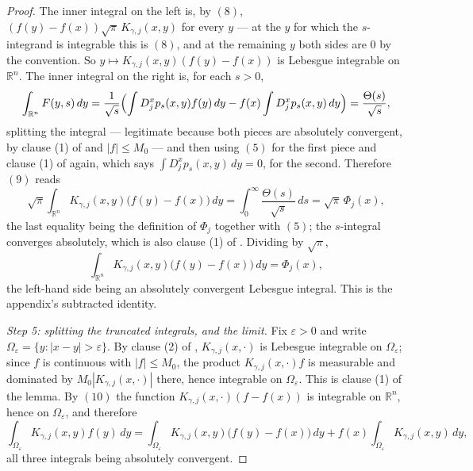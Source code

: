 \begin{proof}
The inner integral on the left is, by $(8)$,
$(f(y)-f(x))\sqrt\pi\,K_{\gamma,j}(x,y)$ for every $y$ --- at the $y$ for which
the $s$-integrand is integrable this is $(8)$, and at the remaining $y$ both
sides are $0$ by the convention.  So
$y \mapsto K_{\gamma,j}(x,y)(f(y)-f(x))$ is Lebesgue integrable on
$\mathbb{R}^n$.  The inner integral on the right is, for each $s > 0$,
\[
  \int_{\mathbb{R}^n}F(y,s)\,dy
    = \frac{1}{\sqrt s}\Bigl(\int D_j^xp_s(x,y)f(y)\,dy
        - f(x)\int D_j^xp_s(x,y)\,dy\Bigr)
    = \frac{\Theta(s)}{\sqrt s} ,
\]
splitting the integral --- legitimate because both pieces are absolutely
convergent, by clause (1) of  and
$|f| \leq M_0$ --- and then using $(5)$ for the first piece and clause (1) of
 again, which says
$\int D_j^xp_s(x,y)\,dy = 0$, for the second.  Therefore $(9)$ reads
\[
  \sqrt\pi\int_{\mathbb{R}^n}K_{\gamma,j}(x,y)\bigl(f(y)-f(x)\bigr)\,dy
    = \int_0^\infty \frac{\Theta(s)}{\sqrt s}\,ds
    = \sqrt\pi\,\Phi_j(x) ,
\]
the last equality being the definition of $\Phi_j$ together with $(5)$; the
$s$-integral converges absolutely, which is also clause (1) of
.  Dividing by $\sqrt\pi$,
\begin{equation*}
  \int_{\mathbb{R}^n}K_{\gamma,j}(x,y)\bigl(f(y)-f(x)\bigr)\,dy = \Phi_j(x) ,
  \tag{10}
\end{equation*}
the left-hand side being an absolutely convergent Lebesgue integral.  This is
the appendix's subtracted identity.

\emph{Step 5: splitting the truncated integrals, and the limit.}
Fix $\varepsilon > 0$ and write
$\Omega_\varepsilon = \{y : |x-y| > \varepsilon\}$.  By clause (2) of
, $K_{\gamma,j}(x,\cdot)$ is Lebesgue
integrable on $\Omega_\varepsilon$; since $f$ is continuous with
$|f| \leq M_0$, the product $K_{\gamma,j}(x,\cdot)f$ is measurable and dominated
by $M_0|K_{\gamma,j}(x,\cdot)|$ there, hence integrable on $\Omega_\varepsilon$.
This is clause (1) of the lemma.  By $(10)$ the function
$K_{\gamma,j}(x,\cdot)(f-f(x))$ is integrable on $\mathbb{R}^n$, hence on
$\Omega_\varepsilon$, and therefore
\begin{equation*}
  \int_{\Omega_\varepsilon}K_{\gamma,j}(x,y)f(y)\,dy
    = \int_{\Omega_\varepsilon}K_{\gamma,j}(x,y)\bigl(f(y)-f(x)\bigr)\,dy
      + f(x)\int_{\Omega_\varepsilon}K_{\gamma,j}(x,y)\,dy , \tag{11}
\end{equation*}
all three integrals being absolutely convergent.


\end{proof}

